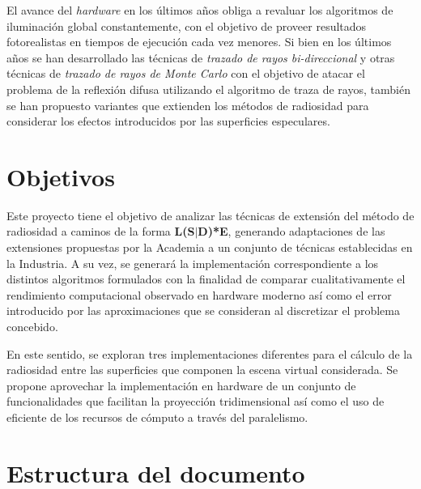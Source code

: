El avance del \textit{hardware} en los últimos años obliga a revaluar los algoritmos de iluminación global constantemente, con el objetivo de proveer resultados fotorealistas en tiempos de ejecución cada vez menores. Si bien en los últimos años se han desarrollado las técnicas de \textit{trazado de rayos bi-direccional} y otras técnicas de \textit{trazado de rayos de Monte Carlo} con el objetivo de atacar el problema de la reflexión difusa utilizando el algoritmo de traza de rayos, también se han propuesto variantes que extienden los métodos de radiosidad para considerar los efectos introducidos por las superficies especulares.


\section{Objetivos}
\label{sec:objetivos}

Este proyecto tiene el objetivo de analizar las técnicas de extensión del método de radiosidad a caminos de la forma \textbf{L(S$|$D)*E}, generando adaptaciones de las extensiones propuestas por la Academia a un conjunto de técnicas establecidas en la Industria. A su vez, se generará la implementación correspondiente a los distintos algoritmos formulados con la finalidad de comparar cualitativamente el rendimiento computacional observado en hardware moderno así como el error introducido por las aproximaciones que se consideran al discretizar el problema concebido.

En este sentido, se exploran tres implementaciones diferentes para el cálculo de la radiosidad entre las superficies que componen la escena virtual considerada. Se propone aprovechar la implementación en hardware de un conjunto de funcionalidades que facilitan la proyección tridimensional así como el uso de eficiente de los recursos de cómputo a través del paralelismo.  


\section{Estructura del documento}
\label{sec:estructuraDelDocumento}

